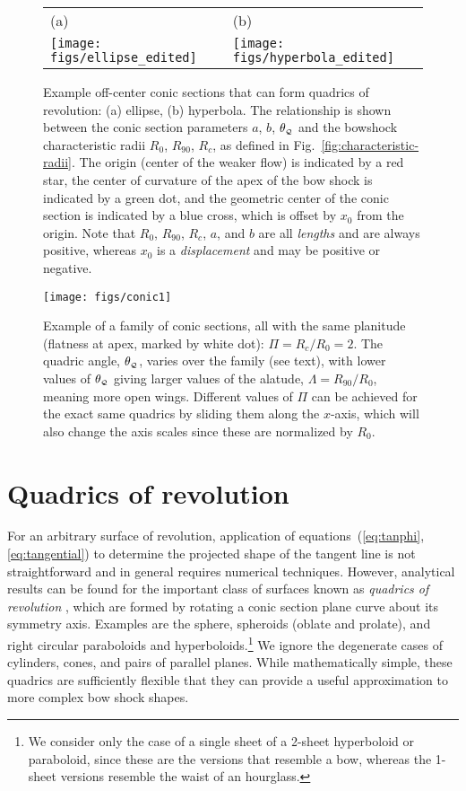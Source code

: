 \documentclass[useAMS, usenatbib, a4paper]{mnras}
\begin{document}
\begin{figure*}
  \setlength\tabcolsep{2em}
  \begin{tabular}{ll}
    (a) & (b) \\
    \texttt{[image: figs/ellipse\_edited]}
        & \texttt{[image: figs/hyperbola\_edited]}
  \end{tabular}
  \caption[]{Example off-center conic sections that can form quadrics of
    revolution: (a) ellipse, (b) hyperbola.  The relationship is shown
    between the conic section parameters \(a\), \(b\), \(\theta_{\scriptscriptstyle \mathcal{Q}}\) and the
    bowshock characteristic radii \(R_0\), \(R_{90}\), \(R_c\), as
    defined in Fig.~\ref{fig:characteristic-radii}. The origin (center
    of the weaker flow) is indicated by a red star, the center of
    curvature of the apex of the bow shock is indicated by a green
    dot, and the geometric center of the conic section is indicated by
    a blue cross, which is offset by \(x_0\) from the origin.  Note
    that \(R_0\), \(R_{90}\), \(R_c\), \(a\), and \(b\) are all
    \emph{lengths} and are always positive, whereas \(x_0\) is a
    \emph{displacement} and may be positive or negative.}
  \label{fig:conics}
\end{figure*}
\begin{figure}
  \texttt{[image: figs/conic1]}
  \caption[]{Example of a family of conic sections, all with the same
    planitude (flatness at apex, marked by white dot):
    \(\Pi = R_c/R_0 = 2 \). The quadric angle, \(\theta_{\scriptscriptstyle \mathcal{Q}}\), varies over
    the family (see text), with lower values of \(\theta_{\scriptscriptstyle \mathcal{Q}}\) giving
    larger values of the alatude, \(\Lambda = R_{90}/R_0 \), meaning more
    open wings.  Different values of \(\Pi\) can be achieved for the
    exact same quadrics by sliding them along the \(x\)-axis, which
    will also change the axis scales since these are normalized by
    \(R_0\).}
  \label{fig:conics-family}
\end{figure}


\section{Quadrics of revolution}
\label{sec:conic}


For an arbitrary surface of revolution, application of
equations~(\ref{eq:tanphi}, \ref{eq:tangential}) to determine the
projected shape of the tangent line is not straightforward and in
general requires numerical techniques.  However, analytical results
can be found for the important class of surfaces known as
\textit{quadrics of revolution} \citep{Goldman:1983a, Gfrerrer:2009a},
which are formed by rotating a conic section plane curve about its
symmetry axis.  Examples are the sphere, spheroids (oblate and
prolate), and right circular paraboloids and hyperboloids.\footnote{We
  consider only the case of a single sheet of a 2-sheet hyperboloid or
  paraboloid, since these are the versions that resemble a bow,
  whereas the 1-sheet versions resemble the waist of an hourglass.}
We ignore the degenerate cases of cylinders, cones, and pairs of
parallel planes.  While mathematically simple, these quadrics are
sufficiently flexible that they can provide a useful approximation to
more complex bow shock shapes.
\end{document}
